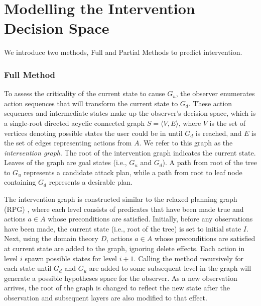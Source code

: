 \section{Modelling the Intervention Decision Space}
\label{sec:stategraph}
We introduce two methods, Full and Partial Methods to predict intervention.
\subsubsection{Full Method}
To assess the criticality of the current state to cause $G_u$, the observer enumerates action sequences that will transform the current state to $G_d$. These action sequences and intermediate states make up the observer's decision space, which is a single-root directed acyclic connected graph $S= \langle V,E \rangle$, where $V$ is the set of vertices denoting possible states the user could be in until $G_d$ is reached, and $E$ is the set of edges representing actions from $A$. We refer to this graph as the \textit{intervention graph}. The root of the intervention graph indicates the current state. Leaves of the graph are goal states (i.e., $G_u$ and $G_d$). A path from root of the tree to $G_u$ represents a candidate attack plan, while a path from root to leaf node containing $G_d$ represents a desirable plan.

The intervention graph is constructed similar to the relaxed planning graph (RPG) \cite{bonet01planningas}, where each level consists of predicates that have been made true and actions $a\in A$ whose preconditions are satisfied. Initially, before any observations have been made, the current state (i.e., root of the tree) is set to initial state $I$. Next, using the domain theory $D$, actions  $a\in A$ whose preconditions are satisfied at current state are added to the graph, ignoring delete effects. Each action in level $i$ spawn possible states for level $i+1$. Calling the method recursively for each state until $G_d$ and $G_u$ are added to some subsequent level in the graph will generate a possible hypotheses space for the observer. As a new observation arrives, the root of the graph is changed to reflect the new state after the observation and subsequent layers are also modified to that effect.


